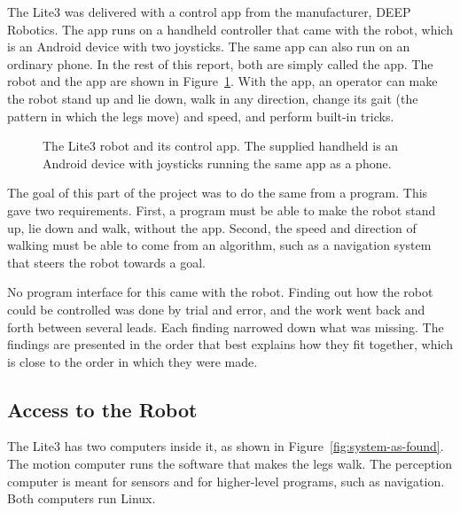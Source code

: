 The Lite3 was delivered with a control app from the manufacturer, DEEP Robotics. The app runs on a handheld
controller that came with the robot, which is an Android device with two joysticks. The same app can also
run on an ordinary phone. In the rest of this report, both are simply called the app. The robot and the app
are shown in Figure~\ref{fig:robot-app}. With the app, an operator can make the robot stand up and lie
down, walk in any direction, change its gait (the pattern in which the legs move) and speed, and perform
built-in tricks.

\begin{figure}[htbp]
\centering
{}
\caption{The Lite3 robot and its control app. The supplied handheld is an Android device with joysticks
running the same app as a phone.}
\label{fig:robot-app}
\end{figure}

The goal of this part of the project was to do the same from a program. This gave two requirements. First,
a program must be able to make the robot stand up, lie down and walk, without the app. Second, the speed
and direction of walking must be able to come from an algorithm, such as a navigation system that steers
the robot towards a goal.

No program interface for this came with the robot. Finding out how the robot could be controlled was done
by trial and error, and the work went back and forth between several leads. Each finding narrowed down
what was missing. The findings are presented in the order that best explains how they fit together, which
is close to the order in which they were made.

\subsection{Access to the Robot}
\label{sec:access}

The Lite3 has two computers inside it, as shown in Figure~\ref{fig:system-as-found}. The motion computer
runs the software that makes the legs walk. The perception computer is meant for sensors and for
higher-level programs, such as navigation. Both computers run Linux.

